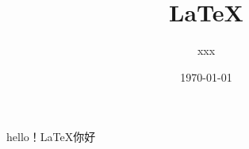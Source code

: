 \documentclass[UTF8]{ctexart}
\title{LaTeX}
\author{xxx}
\date{\today}
\begin{document}
hello！LaTeX你好
\end{document}
